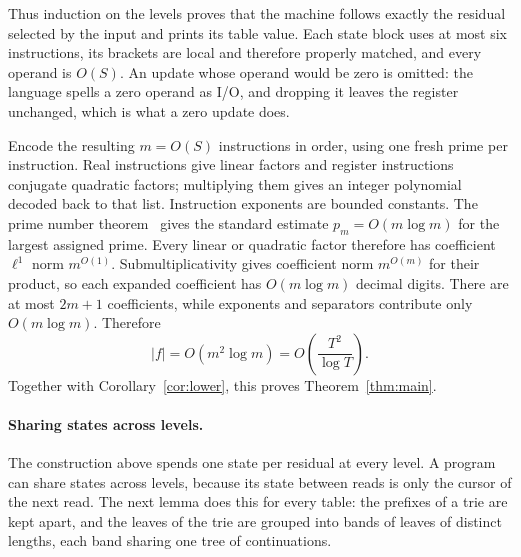 \documentclass[11pt]{article}
\theoremstyle{remark}
\begin{document}
Thus induction on the levels proves that
the machine follows exactly the residual selected by the input and prints its
table value.  Each state block uses at most six instructions, its brackets
are local and therefore properly matched, and every operand is $O(S)$.  An
update whose operand would be zero is omitted: the language spells a zero
operand as I/O, and dropping it leaves the register unchanged, which is what
a zero update does.

Encode the resulting $m=O(S)$ instructions in order, using one fresh prime
per instruction.  Real instructions give linear factors and register
instructions conjugate quadratic factors; multiplying them gives an integer
polynomial decoded back to that list.  Instruction exponents are bounded
constants.  The prime number theorem~\cite{rs} gives the standard estimate
$p_m=O(m\log m)$ for the largest assigned prime.  Every
linear or quadratic factor therefore has
coefficient $\ell^1$ norm $m^{O(1)}$.  Submultiplicativity gives coefficient
norm $m^{O(m)}$ for their product, so each expanded coefficient has
$O(m\log m)$ decimal digits.  There are at most $2m+1$ coefficients, while
exponents and separators contribute only $O(m\log m)$.  Therefore
\[
  |f|=O(m^2\log m)
      =O\!\left(\frac{T^2}{\log T}\right).
\]
Together with Corollary~\ref{cor:lower}, this proves
Theorem~\ref{thm:main}.

\paragraph{Sharing states across levels.}
The construction above spends one state per residual at every level.  A program can
share states across levels, because its state between reads is only the cursor of the
next read.  The next lemma does this for every table: the prefixes of a trie are kept
apart, and the leaves of the trie are grouped into bands of leaves of distinct lengths,
each band sharing one tree of continuations.
\end{document}
